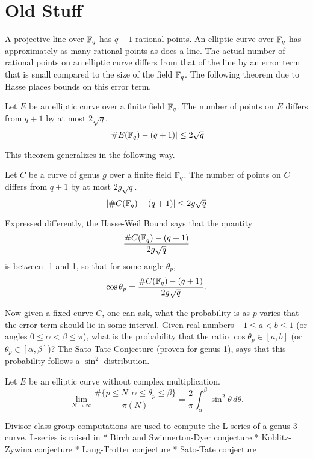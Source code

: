 
\section{Old Stuff}


A projective line over $\mathbb{F}_q$ has $q + 1$ rational points.
An elliptic curve over $\mathbb{F}_q$ has approximately as many rational points as does a line.
The actual number of rational points on an elliptic curve differs from that of the line by an error term
that is small compared to the size of the field $\mathbb{F}_q$.
The following theorem due to Hasse places bounds on this error term.
\begin{theorem}
  Let $E$ be an elliptic curve over a finite field $\mathbb{F}_q$.
  The number of points on $E$ differs from $q + 1$ by at most $2 \sqrt q$.
  \[ | \#E(\mathbb{F}_q) - (q + 1) | \leq 2 \sqrt q \]
\end{theorem}

This theorem generalizes in the following way.
\begin{theorem}
  Let $C$ be a curve of genus $g$ over a finite field $\mathbb{F}_q$.
  The number of points on $C$ differs from $q + 1$ by at most $2 g \sqrt q$.
  \[ | \#C(\mathbb{F}_q) - (q + 1) | \leq 2 g \sqrt q \]
\end{theorem}

Expressed differently, the Hasse-Weil Bound says that the quantity
\begin{equation}
  \frac {\#C(\mathbb{F}_q) - (q + 1)}{2 g \sqrt q}
\end{equation}
is between -1 and 1, so that for some angle $\theta_p$,
\begin{equation}
  \label{eq_sato_tate_ratio}
 \cos \theta_p = \frac {\#C(\mathbb{F}_q) - (q + 1)}{2 g \sqrt q}.
\end{equation}

Now given a fixed curve $C$, one can ask, what the probability is as $p$ varies that the error term should lie in some interval.
Given real numbers $-1 \leq a < b \leq 1$ (or angles $0 \leq \alpha < \beta \leq \pi$),
what is the probability that the ratio $\cos \theta_p \in [a, b]$ (or $\theta_p \in [\alpha, \beta]$)?
The Sato-Tate Conjecture (proven for genus 1), says that this probability follows a $\sin^2$ distribution.

\begin{conjecture}
  Let $E$ be an elliptic curve without complex multiplication.
  \[ \lim_{N \to \infty} \frac {\#\{ p \leq N : \alpha \leq \theta_p \leq \beta \}} {\pi(N)} = \frac 2 \pi \int_{\alpha}^{\beta} \sin^2 \theta\,d\theta. \]
\end{conjecture}

Divisor class group computations are used to compute the L-series of a genus 3 curve.
L-series is raised in
  * Birch and Swinnerton-Dyer conjecture
  * Koblitz-Zywina conjecture
  * Lang-Trotter conjecture
  * Sato-Tate conjecture
